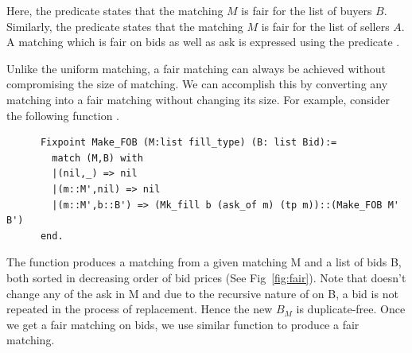\documentclass[a4paper,UKenglish,cleveref, autoref]{lipics-v2019}
\begin{document}
\begin{definition}
 \end{definition}
\begin{definition}
\end{definition}
\begin{definition}
\end{definition}

Here, the predicate   states that the matching $M$  is fair for the list of buyers $B$. Similarly,  the predicate  states that the matching $M$  is fair for the list of sellers $A$.  A matching which is fair on bids as well as ask is expressed using the predicate .

Unlike the uniform matching, a fair matching can always be achieved without compromising the size of matching. We can accomplish this by converting any matching into a fair matching without changing its size. For example, consider the following function .

\begin{verbatim}
	  Fixpoint Make_FOB (M:list fill_type) (B: list Bid):=
	    match (M,B) with 
	    |(nil,_) => nil
	    |(m::M',nil) => nil
	    |(m::M',b::B') => (Mk_fill b (ask_of m) (tp m))::(Make_FOB M' B')
	  end.
\end{verbatim}

The function  produces a  matching from a given matching M and a list of bids B, both sorted in decreasing order of bid prices (See Fig~\ref{fig:fair}).  Note that  doesn't change any of the ask in M and due to the recursive nature of  on B, a bid is not repeated in the process of replacement.  Hence the new $B_M$ is duplicate-free. Once we get a fair matching on bids, we use similar function  to produce a fair matching. 
\end{document}
